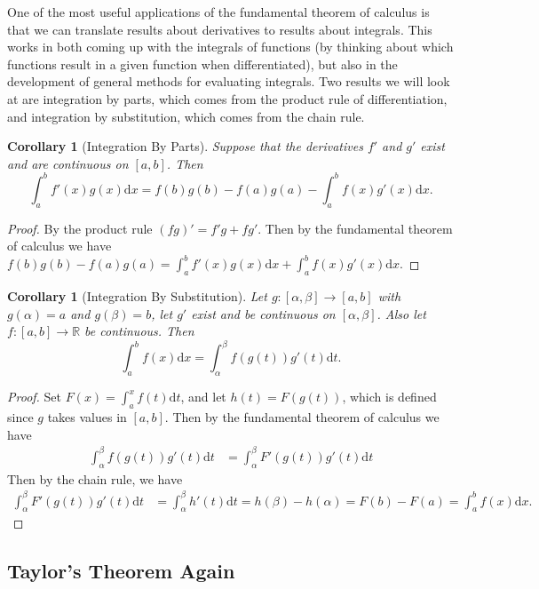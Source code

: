 \documentclass[11pt, a4paper]{article}
\newtheorem{corollary}[theorem]{Corollary}
\theoremstyle{definition}
\newcommand{\R}{\mathbb{R}}
\newcommand{\dd}{\mathrm{d}}
\begin{document}
One of the most useful applications of the fundamental theorem of calculus is that we can translate results about derivatives to results about integrals. This works in both coming up with the integrals of functions (by thinking about which functions result in a given function when differentiated), but also in the development of general methods for evaluating integrals. Two results we will look at are integration by parts, which comes from the product rule of differentiation, and integration by substitution, which comes from the chain rule.

\begin{corollary}[Integration By Parts]
	Suppose that the derivatives $f'$ and $g'$ exist and are continuous on $[a, b]$. Then
	$$
	\int_a^b f'(x)g(x) \dd x = f(b)g(b) - f(a)g(a) - \int_a^b f(x)g'(x) \dd x.
	$$
\end{corollary}
\begin{proof}
	By the product rule $(fg)' = f'g + fg'$. Then by the fundamental theorem of calculus we have
	$
	f(b)g(b) - f(a)g(a) = \int_a^b f'(x)g(x) \dd x + \int_a^b f(x) g'(x) \dd x.
 	$
\end{proof}

\begin{corollary}[Integration By Substitution]
	Let $g:[\alpha, \beta] \rightarrow [a, b]$ with $g(\alpha) = a$ and $g(\beta) = b$, let $g'$ exist and be continuous on $[\alpha, \beta]$. Also let $f:[a, b] \rightarrow \R$ be continuous. Then
	$$
	\int_a^b f(x) \dd x = \int_{\alpha}^{\beta} f(g(t)) g'(t) \dd t.
	$$
\end{corollary}
\begin{proof}
	Set $F(x) = \int_a^x f(t) \dd t$, and let $h(t) = F(g(t))$, which is defined since $g$ takes values in $[a, b]$. Then by the fundamental theorem of calculus we have
	\begin{align*}
		\int_{\alpha}^{\beta} f(g(t)) g'(t) \dd t &= \int_{\alpha}^{\beta} F'(g(t)) g'(t) \dd t
	\end{align*}
	Then by the chain rule, we have
	\begin{align*}
		\int_{\alpha}^{\beta} F'(g(t)) g'(t) \dd t &= \int_{\alpha}^{\beta} h'(t) \dd t = h(\beta) - h(\alpha) = F(b) - F(a) = \int_a^b f(x) \dd x.
	\end{align*}
\end{proof}

\subsection{Taylor's Theorem Again}
\end{document}

